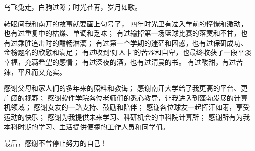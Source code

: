
\begin{zhixie}
乌飞兔走，白驹过隙；时光荏苒，岁月如歌。

转眼间我和南开的故事就要画上句号了，
四年时光里有过入学前的憧憬和激动，也有过重复中的枯燥、单调和乏味；
有过输掉第一场篮球比赛的落寞和不甘，也有过乘胜追击时的酣畅淋漓；
有过第一个学期的迷茫和困惑，也有过保研成功、金榜题名的欣慰和满足；
有过收到‘好人卡’的苦涩和自卑，也最终收获了一段平淡幸福，充满希望的感情；
有过深夜的酒，也有过清晨的书。
有过酸甜，有过苦辣，平凡而又充实。

感谢父母和家人们的多年来的照料和教诲；
感谢南开大学给了我更高的平台、更广阔的视野；
感谢软件学院各位老师们的悉心教导，让我进入到蓬勃发展的计算机领域；
感谢女友的一路支持、鼓励和陪伴；
感谢各位球友一起挥汗如雨，享受运动的快乐；
感谢为我提供未来学习、科研机会的中科院计算所；
感谢所有为我本科时期的学习、生活提供便捷的工作人员和同学们。

最后，感谢不曾停止努力的自己！



\end{zhixie}